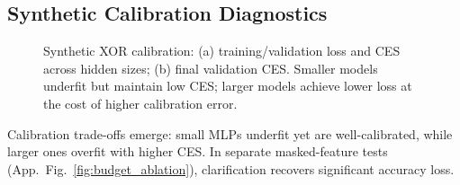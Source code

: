 \documentclass{article}
\begin{document}
\subsection{Synthetic Calibration Diagnostics}
\begin{figure}[t]
  \centering
  \caption{Synthetic XOR calibration: (a) training/validation loss and CES across hidden sizes; (b) final validation CES. Smaller models underfit but maintain low CES; larger models achieve lower loss at the cost of higher calibration error.}
  \label{fig:xor_curves}
\end{figure}
Calibration trade-offs emerge: small MLPs underfit yet are well-calibrated, while larger ones overfit with higher CES. In separate masked-feature tests (App.~Fig.~\ref{fig:budget_ablation}), clarification recovers significant accuracy loss.
\end{document}
